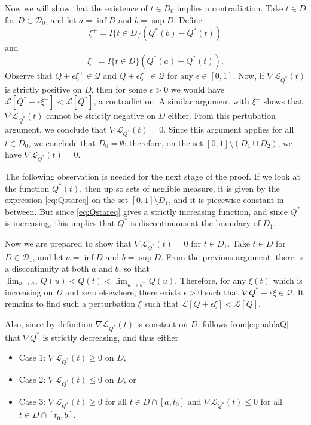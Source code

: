 \documentclass[12pt]{article}
\begin{document}
Now we will show that the existence of $t \in D_0$ implies a contradiction.
Take $t \in D$ for $D \in \mathcal{D}_0$, and let $a = \inf D$ and $b
= \sup D$.  Define
\[
\xi^+ = I\{t \in D\} (Q^*(b) - Q^*(t))
\]
and
\[
\xi^- = I\{t \in D\} (Q^*(a) - Q^*(t)).
\]
Observe that $Q + \epsilon \xi^+ \in \mathcal{Q}$ and $Q
+ \epsilon \xi^- \in \mathcal{Q}$ for any $\epsilon \in [0,1]$.  Now,
if $\nabla \mathcal{L}_{Q^*}(t)$ is strictly positive on $D$, then for some
$\epsilon > 0$ we would have $\mathcal{L}[Q^* + \epsilon \xi^-]
< \mathcal{L}[Q^*]$, a contradiction.  A similar argument with $\xi^+$
shows that $\nabla \mathcal{L}_{Q^*}(t)$ cannot be strictly negative on $D$ either.
From this pertubation argument, we conclude that $\nabla \mathcal{L}_{Q^*}(t) = 0$.
Since this argument applies for all $t \in D_0$, we conclude that $D_0
= \emptyset$: therefore, on the set $[0,1] \setminus (D_1 \cup D_2)$,
we have $\nabla \mathcal{L}_{Q^*}(t) = 0.$

The following observation is needed for the next stage of the proof.
If we look at the function $Q^*(t)$, then up so sets of neglible
measure, it is given by the expression \eqref{eq:Qstareq} on the set
$[0,1]\setminus D_1$, and it is piecewise constant in-between.  But
since \eqref{eq:Qstareq} gives a strictly increasing function, and
since $Q^*$ is increasing, this implies that $Q^*$ is discontinuous at
the boundary of $D_1$.

Now we are prepared to show that $\nabla \mathcal{L}_{Q^*}(t) = 0$ for $t \in D_1$.
Take $t \in D$ for $D \in \mathcal{D}_1$, and let $a = \inf D$ and $b
= \sup D$.  From the previous argument, there is a discontinuity at
both $a$ and $b$, so that $\lim_{u \to a^-} Q(u) < Q(t) < \lim_{u \to
b^+} Q(u)$.  Therefore, for any $\xi(t)$ which is increasing on $D$
and zero elsewhere, there exists $\epsilon > 0$ such that $\nabla Q^*
+ \epsilon \xi \in \mathcal{Q}.$ It remains to find such a
perturbation $\xi$ such that $\mathcal{L}[Q + \epsilon \xi]
< \mathcal{L}[Q]$.

Also, since by definition $\nabla \mathcal{L}_{Q^*}(t)$ is constant on $D$, follows from\eqref{eq:nablaQ} that
$\nabla Q^*$ is strictly decreasing, and thus either
\begin{itemize}
\item Case 1: $\nabla \mathcal{L}_{Q^*}(t) \geq 0$ on $D$,
\item Case 2: $\nabla \mathcal{L}_{Q^*}(t) \leq 0$ on $D$, or
\item Case 3: $\nabla \mathcal{L}_{Q^*}(t) \geq 0$ for all $t \in D \cap [a, t_0]$ and $\nabla \mathcal{L}_{Q^*}(t) \leq 0$ for all $t \in D \cap [t_0, b]$.
\end{itemize}
\end{document}
